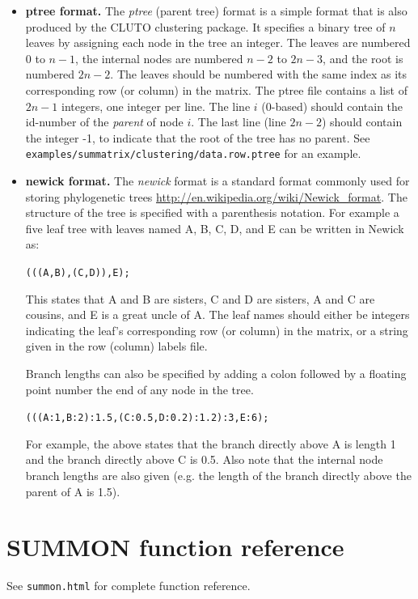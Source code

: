 \documentclass[12pt]{article}
\newcommand{\code}[1]{{\tt #1}}
\begin{document}
\begin{itemize}

    \item {\bf ptree format.}
    The {\em ptree} (parent tree) format is a simple format that is also produced by the
    CLUTO clustering package.  It specifies a binary tree of $n$ leaves by assigning
    each node in the tree an integer.  The leaves are numbered $0$ to $n-1$, the
    internal nodes are numbered $n-2$ to $2n-3$, and the root is
    numbered $2n-2$.  The leaves should be numbered with the same index as its
    corresponding row (or column) in the matrix.  The ptree file contains a list of
    $2n-1$ integers, one integer per line.  The line $i$ (0-based) should contain
    the id-number of the {\em parent} of node $i$.  The last line (line $2n-2$) 
    should contain the integer -1, to indicate that the root of the tree has no
    parent.  See 
    \code{examples/summatrix/clustering/data.row.ptree} for an example.

    
    \item {\bf newick format.}
    The {\em newick} format is a standard format commonly used for storing
    phylogenetic trees \url{http://en.wikipedia.org/wiki/Newick_format}.  The
    structure of the tree is specified with a parenthesis notation.  For example a
    five leaf tree with leaves named A, B, C, D, and E can be written in Newick as:

    \code{(((A,B),(C,D)),E);}

    This states that A and B are sisters, C and D are sisters, A and C are cousins,
    and E is a great uncle of A.  The leaf names should either be integers
    indicating the leaf's corresponding row (or column) in the matrix, or a string
    given in the row (column) labels file.

    Branch lengths can also be specified by adding a
    colon followed by a floating point number the end of any node in the tree.

    \code{(((A:1,B:2):1.5,(C:0.5,D:0.2):1.2):3,E:6);}

    For example, the above states that the branch directly above A is length 1 and
    the branch directly above C is 0.5.  Also note that the internal node branch 
    lengths are also given (e.g. the length of the branch directly above the
    parent of A is 1.5).

\end{itemize}

\section{SUMMON function reference}

See \code{summon.html} for complete function reference.
\end{document}
